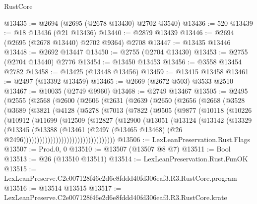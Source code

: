 \begin{lexlean}{RustCore}
\begin{coremodule}
@13435 := @2694 (@2695 (@2678 @13430) @2702 @3540)
@13436 := 520
@13439 := @18 @13436 (@21 @13436)
@13440 := @2879 @13439
@13446 := @2694 (@2695 (@2678 @13440) @2702 @9364) @2708
@13447 := @13435 @13446
@13448 := @2692 @13447
@13450 := @2755 (@2704 @13430)
@13453 := @2755 (@2704 @13440) @2776
@13454 := @13450 @13453
@13456 := @3558 @13454 @2782
@13458 := @13425 (@13448 @13456)
@13459 := @13415 @13458
@13461 := @2497 (@13392 @13459)
@13465 := @2669 (@2672 @503) @3533 @2510
@13467 := @10035 (@2749 @9960)
@13468 := @2749 @13467
@13505 := @2495
    (@2555
      (@2568
        (@2600
          (@2606
            (@2631
              (@2639
                (@2650
                  (@2656
                    (@2668
                      (@3528
                        (@3689
                          (@3821
                            (@4128
                              (@5278
                                (@7013
                                  (@7822
                                    (@9505
                                      (@9877
                                        (@10118
                                          (@10226
                                            (@10912
                                              (@11699
                                                (@12509
                                                  (@12827
                                                    (@12900
                                                      (@13051
                                                        (@13124
                                                          (@13142
                                                            (@13329
                                                              (@13345
                                                                (@13388
                                                                  (@13461
                                                                    (@2497
                                                                      (@13465 @13468)
                                                                      (@26
                                                                        @2496))))))))))))))))))))))))))))))))))
@13506 := LexLeanPreservation.Rust.Flags
@13507 := Prod.{0, 0}
@13510 := @13507 (@13507 @8 @7)
@13511 := Bool
@13513 := @26 (@13510 @13511)
@13514 := LexLeanPreservation.Rust.FunOK
@13515 := LexLeanPreserve.C2e007128f46e2d6e8fddd40fd306eaf3.R3.RustCore.program
@13516 := @13514 @13515
@13517 := LexLeanPreserve.C2e007128f46e2d6e8fddd40fd306eaf3.R3.RustCore.krate

\end{coremodule}
\end{lexlean}
